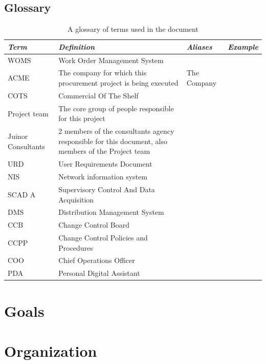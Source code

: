 \documentclass[a4paper]{article}
\begin{document}
\subsection{Glossary}
\label{sub:glossary}

\begin{table}[H]
	\centering
	\begin{tabular}{|p{2cm}| p{3cm} |l| p{3cm} |}
	\hline
		\textit{Term} & \textit{Definition} & \textit{Aliases} & \textit{Example} \\
	\hline 
		
		WOMS	 & Work Order Management System & & \\ \hline
		
		ACME	 & The company for which this procurement project is being executed& The Company & \\	\hline
		COTS	 & Commercial Of The Shelf & & \\ \hline
		Project team & The core group of people responsible for this project & & \\ \hline
		Juinor Consultants & 2 members of the consultants agency responsible for this document, also members of the Project team & & \\ \hline
		URD & User Requirements Document & & \\ \hline
		NIS	& Network information system & & \\	\hline	
		SCAD	A & Supervisory Control And Data Acquisition & & \\  \hline
		DMS & Distribution Management System & & \\ \hline
		CCB	& Change Control Board & & \\ \hline
		CCPP	 & Change Control Policies and Procedures & & \\ \hline
		COO	& Chief Operations Officer & & \\ \hline
		PDA	& Personal Digital Assistant & & \\ 

	\hline
	
	\end{tabular}
	\caption{A glossary of terms used in the document}
\end{table}

\section{Goals} 
\label{sec:goals}


\section{Organization}
\label{sec:organization}
\end{document}
